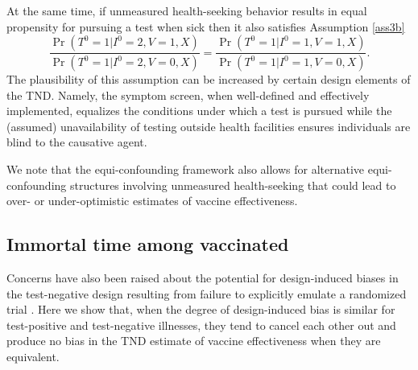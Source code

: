 \begin{appendix}
\begin{refsection}
    At the same time, if unmeasured health-seeking behavior results in equal propensity for pursuing a test when sick then it also satisfies Assumption \ref{ass3b}
    \[\dfrac{\Pr(T^0 = 1 | I^0 =2, V =1, X)}{\Pr(T^0 = 1 | I^0 =2, V =0, X)}=\dfrac{\Pr(T^0 = 1 | I^0 =1, V =1, X)}{\Pr(T^0 = 1 | I^0 =1, V =0, X)}.\]
    The plausibility of this assumption can be increased by certain design elements of the TND. Namely, the symptom screen, when well-defined and effectively implemented, equalizes the conditions under which a test is pursued while the (assumed) unavailability of testing outside health facilities ensures individuals are blind to the causative agent. 

    We note that the equi-confounding framework also allows for alternative equi-confounding structures involving unmeasured health-seeking that could lead to over- or under-optimistic estimates of vaccine effectiveness. 
    
    \subsection{Immortal time among vaccinated}
    Concerns have also been raised about the potential for design-induced biases in the test-negative design resulting from failure to explicitly emulate a randomized trial \cite{li2024comparison}. Here we show that, when the degree of design-induced bias is similar for test-positive and test-negative illnesses, they tend to cancel each other out and produce no bias in the TND estimate of vaccine effectiveness when they are equivalent. 
    

\end{refsection}
\end{appendix}
